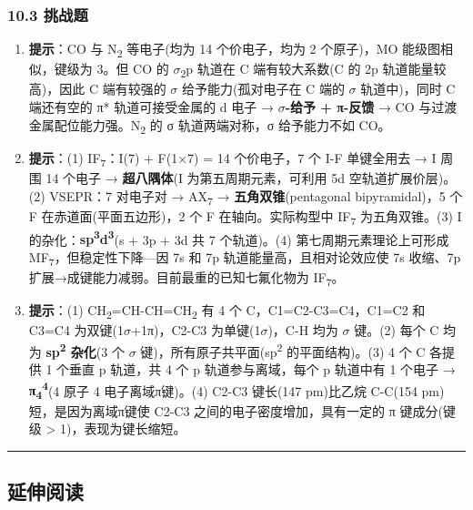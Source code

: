 \subsubsection{10.3 挑战题}\label{ux6311ux6218ux9898-1}

\begin{enumerate}
\def\labelenumi{\arabic{enumi}.}
\setcounter{enumi}{8}
\item
  \textbf{提示}：CO 与 N\textsubscript{2} 等电子(均为 14 个价电子，均为 2 个原子)，MO 能级图相似，键级为 3。但 CO 的 \(\sigma\)\textsubscript{2}p 轨道在 C 端有较大系数(C 的 2p 轨道能量较高)，因此 C 端有较强的 \(\sigma\) 给予能力(孤对电子在 C 端的 \(\sigma\) 轨道中)，同时 C 端还有空的 π* 轨道可接受金属的 d 电子 → \textbf{\(\sigma\)-给予 + π-反馈} → CO 与过渡金属配位能力强。N\textsubscript{2} 的 σ 轨道两端对称，σ 给予能力不如 CO。
\item
  \textbf{提示}：(1) IF\textsubscript{7}：I(7) + F(1×7) = 14 个价电子，7 个 I-F 单键全用去 → I 周围 14 个电子 → \textbf{超八隅体}(I 为第五周期元素，可利用 5d 空轨道扩展价层)。(2) VSEPR：7 对电子对 → AX\textsubscript{7} → \textbf{五角双锥}(pentagonal bipyramidal)，5 个 F 在赤道面(平面五边形)，2 个 F 在轴向。实际构型中 IF\textsubscript{7} 为五角双锥。(3) I 的杂化：\textbf{sp\textsuperscript{3}d\textsuperscript{3}}(s + 3p + 3d 共 7 个轨道)。(4) 第七周期元素理论上可形成 MF\textsubscript{7}，但稳定性下降---因 7s 和 7p 轨道能量高，且相对论效应使 7s 收缩、7p 扩展→成键能力减弱。目前最重的已知七氟化物为 IF\textsubscript{7}。
\item
  \textbf{提示}：(1) CH\textsubscript{2}=CH-CH=CH\textsubscript{2} 有 4 个 C，C1=C2-C3=C4，C1=C2 和 C3=C4 为双键(1\(\sigma\)+1π)，C2-C3 为单键(1\(\sigma\))，C-H 均为 \(\sigma\) 键。(2) 每个 C 均为 \textbf{sp\textsuperscript{2} 杂化}(3 个 \(\sigma\) 键)，所有原子共平面(sp\textsuperscript{2} 的平面结构)。(3) 4 个 C 各提供 1 个垂直 p 轨道，共 4 个 p 轨道参与离域，每个 p 轨道中有 1 个电子 → \textbf{π\textsubscript{4}\textsuperscript{4}}(4 原子 4 电子离域π键)。(4) C2-C3 键长(147 pm)比乙烷 C-C(154 pm)短，是因为离域π键使 C2-C3 之间的电子密度增加，具有一定的 π 键成分(键级 \textgreater{} 1)，表现为键长缩短。
\end{enumerate}

\begin{center}\rule{0.5\linewidth}{0.5pt}\end{center}

\subsection{延伸阅读}\label{ux5ef6ux4f38ux9605ux8bfb}

